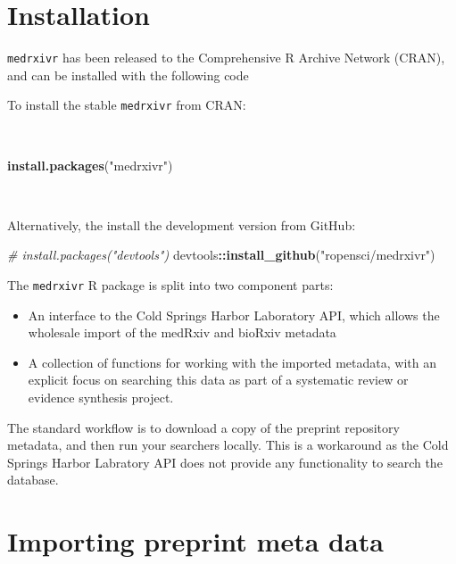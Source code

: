 \documentclass[a4paper, twoside]{templates/ociamthesis}
\providecommand{\tightlist}{%
  \setlength{\itemsep}{0pt}\setlength{\parskip}{0pt}}
\newenvironment{Shaded}{\begin{snugshade}}{\end{snugshade}}
\newcommand{\CommentTok}[1]{\textcolor[rgb]{0.56,0.35,0.01}{\textit{#1}}}
\newcommand{\KeywordTok}[1]{\textcolor[rgb]{0.13,0.29,0.53}{\textbf{#1}}}
\newcommand{\NormalTok}[1]{#1}
\newcommand{\OperatorTok}[1]{\textcolor[rgb]{0.81,0.36,0.00}{\textbf{#1}}}
\newcommand{\StringTok}[1]{\textcolor[rgb]{0.31,0.60,0.02}{#1}}
\renewenvironment{Shaded}
{
  \vspace{4pt}%
  \begin{snugshade}%
}{%
  \end{snugshade}%
  \vspace{4pt}%
}
\begin{document}
\hypertarget{installation}{%
\section{Installation}\label{installation}}

\texttt{medrxivr} has been released to the Comprehensive R Archive Network (CRAN), and can be installed with the following code

To install the stable \texttt{medrxivr} from CRAN:

~

\begin{Shaded}
\begin{Highlighting}[]
\KeywordTok{install.packages}\NormalTok{(}\StringTok{"medrxivr"}\NormalTok{)}
\end{Highlighting}
\end{Shaded}

~

Alternatively, the install the development version from GitHub:

\begin{Shaded}
\begin{Highlighting}[]
\CommentTok{# install.packages("devtools") }
\NormalTok{devtools}\OperatorTok{::}\KeywordTok{install_github}\NormalTok{(}\StringTok{"ropensci/medrxivr"}\NormalTok{)}
\end{Highlighting}
\end{Shaded}

The \texttt{medrxivr} R package is split into two component parts:

\begin{itemize}
\tightlist
\item
  An interface to the Cold Springs Harbor Laboratory API, which allows the wholesale import of the medRxiv and bioRxiv metadata
\item
  A collection of functions for working with the imported metadata, with an explicit focus on searching this data as part of a systematic review or evidence synthesis project.
\end{itemize}

The standard workflow is to download a copy of the preprint repository metadata, and then run your searchers locally. This is a workaround as the Cold Springs Harbor Labratory API does not provide any functionality to search the database.

\hypertarget{importing-preprint-meta-data}{%
\section{Importing preprint meta data}\label{importing-preprint-meta-data}}
\end{document}
